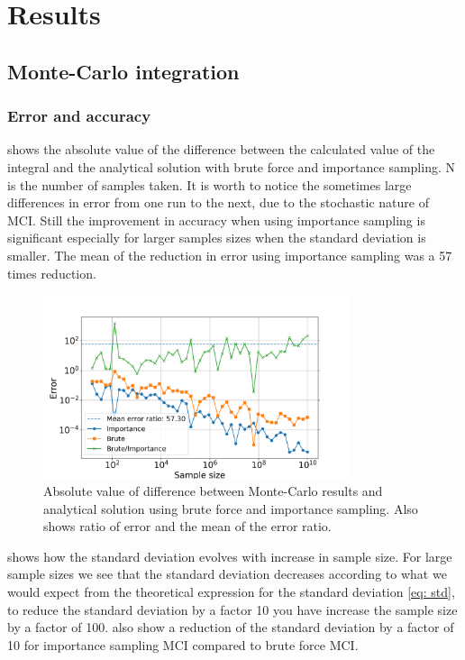 \section{Results}

\subsection{Monte-Carlo integration}

\subsubsection{Error and accuracy}

 shows the absolute value of the difference between the
calculated value of the integral and the analytical solution with brute force
and importance sampling. N is the number of samples taken. It is worth to notice the sometimes
large differences in error from one run to the next, due to the stochastic nature of
MCI. Still the improvement in accuracy when using importance sampling
is significant especially for larger samples sizes when the standard
deviation is smaller. The mean of the reduction in error using importance sampling
was a 57 times reduction.


\begin{figure}[H]
  \centering
  \includegraphics[width=0.8\textwidth]{../figures/mc_error.png}
  \caption{Absolute value of difference between Monte-Carlo results and analytical
  solution using brute force and importance sampling. Also shows ratio of error
  and the mean of the error ratio.}

  \label{fig:mc_error}
\end{figure}


 shows how the standard deviation evolves with increase in
sample size. For large sample sizes we see that the standard deviation decreases
according to what we would expect from the theoretical expression for the standard
deviation \cref{eq: std}, to reduce the standard deviation by a factor 10 you have increase the
sample size by a factor of 100.
 also show a reduction of the standard deviation by a
factor of 10 for importance sampling MCI compared to brute force MCI.

